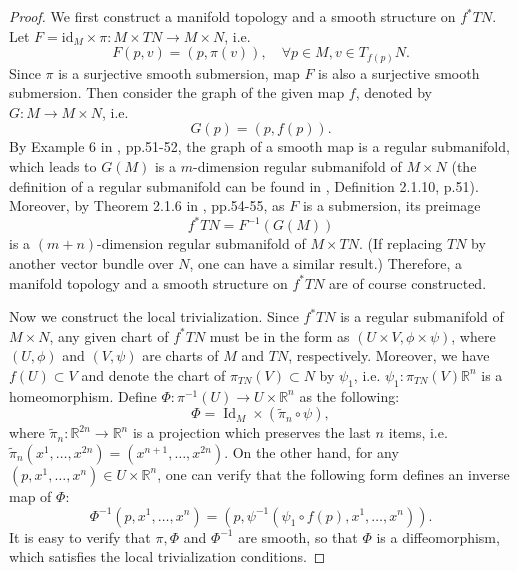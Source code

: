 \documentclass{ctexart}
\begin{document}
\begin{proof}[Proof]
  We first construct a manifold topology and a smooth structure on $f^*TN$. Let $F=\mathrm{id}_M\times \pi:M\times TN\rightarrow M\times N$, i.e.
  $$
  F(p,v)=(p,\pi(v)),\quad \forall p\in M, v\in T_{f(p)}N. 
  $$
  Since $\pi$ is a surjective smooth submersion, map $F$ is also a surjective smooth submersion. Then consider the graph of the given map $f$, 
  denoted by $G:M\rightarrow M\times N$, i.e. 
  $$
  G(p)=(p,f(p)).
  $$
  By Example 6 in \cite{baizhengguoLiManJiHeChuBu1992}, pp.51-52, the graph of a smooth map is a regular submanifold, which leads to $G(M)$ is a $m$-dimension 
  regular submanifold of $M\times N$ (the definition of a regular submanifold can be found in \cite{baizhengguoLiManJiHeChuBu1992}, Definition 2.1.10, p.51). 
  Moreover, by Theorem 2.1.6 in \cite{baizhengguoLiManJiHeChuBu1992}, pp.54-55, as $F$ is a submersion, its preimage
  $$
  f^*TN=F^{-1}\left(G\left(M\right)\right)
  $$
  is a $(m+n)$-dimension regular submanifold of $M\times TN$. (If replacing $TN$ by another vector bundle over $N$, one can have a similar result.)
  Therefore, a manifold topology and a smooth structure on $f^*TN$ are of course constructed. 

  Now we construct the local trivialization. Since $f^*TN$ is a regular submanifold of $M\times N$, any given chart of $f^*TN$ must be in the form 
  as $(U\times V, \phi\times\psi)$, where $(U,\phi)$ and $(V,\psi)$ are charts of $M$ and $TN$, respectively. 
  Moreover, we have $f(U)\subset V$ and denote the chart of $\pi_{TN}(V)\subset N$ by $\psi_1$, i.e. $\psi_1: \pi_{TN}(V)\mathbb{R}^n$ is a homeomorphism.
  Define $\Phi :\pi^{-1}(U)\rightarrow U\times \mathbb{R}^n$ as the following: 
  $$
  \Phi=\operatorname{Id}_M \times (\tilde{\pi}_n\circ \psi), 
  $$
  where $\tilde{\pi}_n: \mathbb{R}^{2n}\rightarrow\mathbb{R}^n$ is a projection which preserves the last $n$ items, 
  i.e. $\tilde{\pi}_n(x^1,\ldots,x^{2n})=(x^{n+1},\ldots,x^{2n})$. 
  On the other hand, for any $(p,x^1,\ldots,x^n)\in U\times \mathbb{R}^n$, one can verify that the following form defines an inverse map of $\Phi$: 
  $$
  \Phi^{-1}(p,x^1,\ldots,x^n)=\left(p,\psi^{-1}\left(\psi_1\circ f\left(p\right),x^1,\ldots,x^n\right)\right). 
  $$
  It is easy to verify that $\pi,\Phi$ and $\Phi^{-1}$ are smooth, so that $\Phi$ is a diffeomorphism, which satisfies the local trivialization conditions. 
\end{proof}
\end{document}
